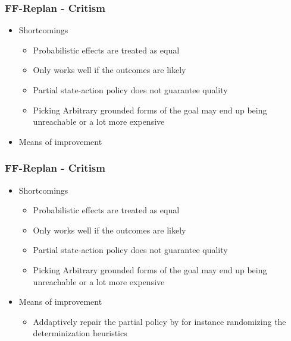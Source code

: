 \documentclass{beamer}
\let\origframetitle=\frametitle
\renewcommand\frametitle[1]{\origframetitle{\textbf{\large{\textrm{#1}}}}}
\begin{document}
\begin{frame}
  \frametitle{FF-Replan - Critism}
  \begin{itemize}
    \item Shortcomings
      \begin{itemize}
        \item Probabilistic effects are treated as equal
        \item Only works well if the outcomes are likely
	\item Partial state-action policy does not guarantee quality
	\item Picking Arbitrary grounded forms of the goal may end up being unreachable or a lot more expensive
      \end{itemize}
    \item Means of improvement
   \end{itemize}
\end{frame}


\begin{frame}
  \frametitle{FF-Replan - Critism}
  \begin{itemize}
    \item Shortcomings
      \begin{itemize}
        \item Probabilistic effects are treated as equal
        \item Only works well if the outcomes are likely
	\item Partial state-action policy does not guarantee quality
	\item Picking Arbitrary grounded forms of the goal may end up being unreachable or a lot more expensive
      \end{itemize}
    \item Means of improvement
      \begin{itemize}
        \item Addaptively repair the partial policy by for instance randomizing the determinization heuristics 
      \end{itemize}
   \end{itemize}
\end{frame}
\end{document}
